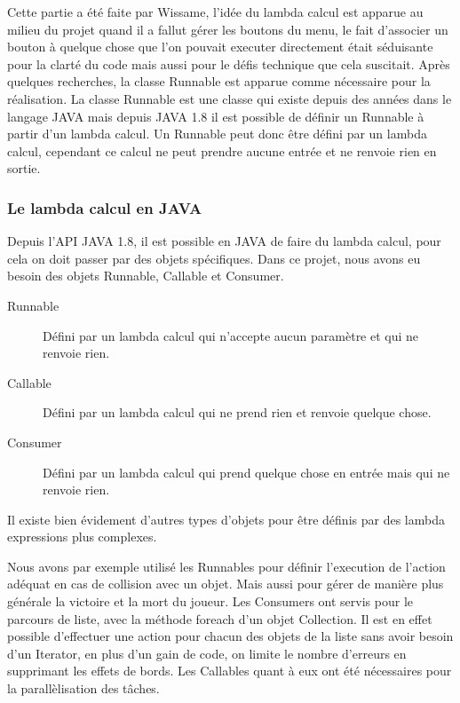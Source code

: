 Cette partie a été faite par Wissame, l'idée du lambda calcul est apparue au milieu du projet quand il a fallut gérer les boutons du menu, le fait d'associer un bouton à quelque chose que l'on pouvait executer directement était séduisante pour la clarté du code mais aussi pour le défis technique que cela suscitait. Après quelques recherches, la classe Runnable est apparue comme nécessaire pour la réalisation.
\ml
La classe Runnable est une classe qui existe depuis des années dans le langage JAVA mais depuis JAVA 1.8 il est possible de définir un Runnable à partir d'un lambda calcul. 
\ml
Un Runnable peut donc être défini par un lambda calcul, cependant ce calcul ne peut prendre aucune entrée et ne renvoie rien en sortie. 

\subsubsection{Le lambda calcul en JAVA}

Depuis l'API JAVA 1.8, il est possible en JAVA de faire du lambda calcul, pour cela on doit passer par des objets spécifiques. Dans ce projet, nous avons eu besoin des objets Runnable, Callable et Consumer.

\begin{description}
\item[Runnable] Défini par un lambda calcul qui n'accepte aucun paramètre et qui ne renvoie rien.
\item[Callable] Défini par un lambda calcul qui ne prend rien et renvoie quelque chose.
\item[Consumer] Défini par un lambda calcul qui prend quelque chose en entrée mais qui ne renvoie rien.
\end{description}

Il existe bien évidement d'autres types d'objets pour être définis par des lambda expressions plus complexes.

Nous avons par exemple utilisé les Runnables pour définir l'execution de l'action adéquat en cas de collision avec un objet. Mais aussi pour gérer de manière plus générale la victoire et la mort du joueur.
\ml
Les Consumers ont servis pour le parcours de liste, avec la méthode foreach d'un objet Collection. Il est en effet possible d'effectuer une action pour chacun des objets de la liste sans avoir besoin d'un Iterator, en plus d'un gain de code, on limite le nombre d'erreurs en supprimant les effets de bords.
\ml
Les Callables quant à eux ont été nécessaires pour la parallèlisation des tâches.

